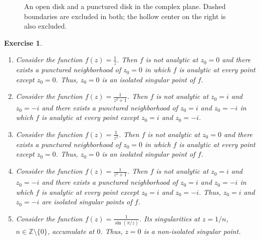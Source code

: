 \documentclass{report}
\newtheorem{exercise}{Exercise}
\begin{document}
\begin{figure}[H]
    \centering
    \caption{An open disk and a punctured disk in the complex plane. Dashed boundaries are excluded in both; the hollow center on the right is also excluded.}
    \label{fig:neighborhoods}
\end{figure}



\begin{exercise}

    \begin{enumerate}
        \item Consider the function $f(z) = \frac{1}{z}$. Then $f$ is not analytic at $z_0 = 0$ and there exists a punctured neighborhood of $z_0 = 0$ in which $f$ is analytic at every point except $z_0 = 0$. Thus, $z_0 = 0$ is an isolated singular point of $f$.
        \item Consider the function $f(z) = \frac{1}{z^2 + 1}$. Then $f$ is not analytic at $z_0 = i$ and $z_0 = -i$ and there exists a punctured neighborhood of $z_0 = i$ and $z_0 = -i$ in which $f$ is analytic at every point except $z_0 = i$ and $z_0 = -i$.
        \item Consider the function $f(z) = \frac{1}{z^2}$. Then $f$ is not analytic at $z_0 = 0$ and there exists a punctured neighborhood of $z_0 = 0$ in which $f$ is analytic at every point except $z_0 = 0$. Thus, $z_0 = 0$ is an isolated singular point of $f$.
        \item Consider the function $f(z) = \frac{1}{z^2 + 1}$. Then $f$ is not analytic at $z_0 = i$ and $z_0 = -i$ and there exists a punctured neighborhood of $z_0 = i$ and $z_0 = -i$ in which $f$ is analytic at every point except $z_0 = i$ and $z_0 = -i$. Thus, $z_0 = i$ and $z_0 = -i$ are isolated singular points of $f$.
        \item Consider the function $f(z) = \frac{1}{\sin(\pi/z)}$. Its singularities at $z=1/n$, $n\in\mathbb{Z}\setminus\{0\}$, accumulate at $0$. Thus, $z=0$ is a non-isolated singular point.
    
    \end{enumerate}
\end{exercise}
\end{document}
